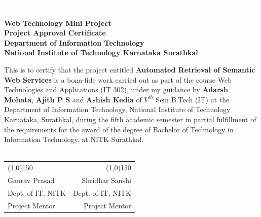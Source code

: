 \documentclass[12pt, twoside]{book}
\newcommand{\project}{Automated Retrieval of Semantic Web Services}
\begin{document}
 \pagebreak \textcolor{white}{text}
\thispagestyle{empty}
\pagebreak
\begin{center}
\Huge
\textbf{Web Technology Mini Project} \\
\textbf{Project Approval Certificate} \\
\vspace{1cm} \Large
\textbf{Department of Information Technology} \\ \vspace{0.5cm}
\textbf{National Institute of Technology Karnataka Surathkal}
\vspace{3cm}
\end{center}
This is to certify that the project entitled \textbf{\project} is a bona-fide work carried out as part of the course Web Technologies and Applications (IT 302), under my guidance by \textbf{Adarsh Mohata}, \textbf{Ajith P S} and \textbf{Ashish Kedia} of $V^{th}$ Sem B.Tech (IT) at the Department of Information Technology, National Institute of Technology Karnataka, Surathkal, during the fifth academic semester in partial fulfillment of the requirements for the award of the degree of Bachelor of Technology in Information Technology, at NITK Surathkal.  \\
\vspace{3cm}
\\
\begin{tabular}{l@{\hskip 4cm} r}
	\line(1,0){150} & \line(1,0){150} \\
	 Gaurav Prasad &  Shridhar Sanshi \\
	 Dept. of IT, NITK & Dept. of IT, NITK \\
	 Project Mentor & Project Mentor \\ 
\end{tabular}
\end{document}
